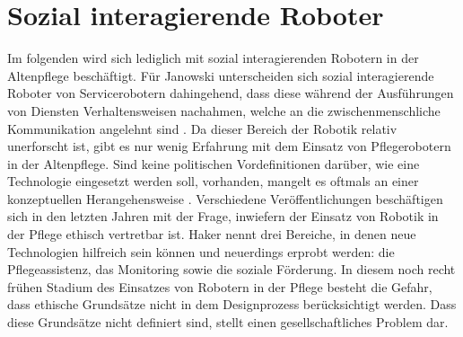
\chapter{Sozial interagierende Roboter}
\label{sec:besondereroboter}
Im folgenden wird sich lediglich mit sozial interagierenden Robotern in der Altenpflege beschäftigt. Für Janowski unterscheiden sich sozial interagierende Roboter von Servicerobotern dahingehend, dass diese während der Ausführungen von Diensten Verhaltensweisen nachahmen, welche an die zwischenmenschliche Kommunikation angelehnt sind \cite[65]{vier}. Da dieser Bereich der Robotik relativ unerforscht ist, gibt es nur wenig Erfahrung mit dem Einsatz von Pflegerobotern in der Altenpflege. Sind keine politischen Vordefinitionen darüber, wie eine Technologie eingesetzt werden soll, vorhanden, mangelt es oftmals an einer konzeptuellen Herangehensweise \cite[1]{comEthics}. Verschiedene Veröffentlichungen beschäftigen sich in den letzten Jahren mit der Frage, inwiefern der Einsatz von Robotik in der Pflege ethisch vertretbar ist. Haker \cite[56]{haker} nennt drei Bereiche, in denen neue Technologien hilfreich sein können und neuerdings erprobt werden: die Pflegeassistenz, das Monitoring sowie die soziale Förderung. In diesem noch recht frühen Stadium des Einsatzes von Robotern in der Pflege besteht die Gefahr, dass ethische Grundsätze nicht in dem Designprozess berücksichtigt werden. Dass diese Grundsätze nicht definiert sind, stellt einen gesellschaftliches Problem dar.
